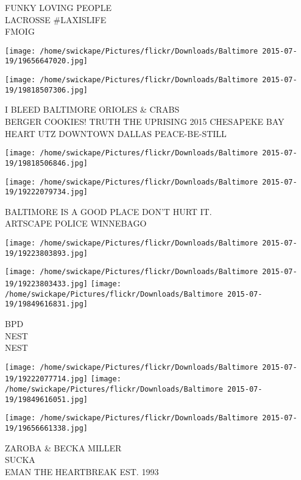 \documentclass[10pt,letterpaper]{article}
\begin{document}
FUNKY LOVING PEOPLE\\
LACROSSE \#LAXISLIFE\\
FMOIG\\
\pagebreak

\texttt{[image: /home/swickape/Pictures/flickr/Downloads/Baltimore 2015-07-19/19656647020.jpg]}

\vspace{0.25in}
\texttt{[image: /home/swickape/Pictures/flickr/Downloads/Baltimore 2015-07-19/19818507306.jpg]}

I BLEED BALTIMORE ORIOLES \& CRABS\\
BERGER COOKIES!  TRUTH THE UPRISING 2015 CHESAPEKE BAY HEART UTZ DOWNTOWN DALLAS PEACE{-}BE{-}STILL\\
\pagebreak

\texttt{[image: /home/swickape/Pictures/flickr/Downloads/Baltimore 2015-07-19/19818506846.jpg]}

\vspace{0.25in}
\texttt{[image: /home/swickape/Pictures/flickr/Downloads/Baltimore 2015-07-19/19222079734.jpg]}

BALTIMORE IS A GOOD PLACE DON'T HURT IT.\\
ARTSCAPE POLICE WINNEBAGO\\
\pagebreak

\texttt{[image: /home/swickape/Pictures/flickr/Downloads/Baltimore 2015-07-19/19223803893.jpg]}

\vspace{0.25in}
\texttt{[image: /home/swickape/Pictures/flickr/Downloads/Baltimore 2015-07-19/19223803433.jpg]}
\texttt{[image: /home/swickape/Pictures/flickr/Downloads/Baltimore 2015-07-19/19849616831.jpg]}

BPD\\
NEST\\
NEST\\
\pagebreak

\texttt{[image: /home/swickape/Pictures/flickr/Downloads/Baltimore 2015-07-19/19222077714.jpg]}
\texttt{[image: /home/swickape/Pictures/flickr/Downloads/Baltimore 2015-07-19/19849616051.jpg]}

\vspace{0.25in}
\texttt{[image: /home/swickape/Pictures/flickr/Downloads/Baltimore 2015-07-19/19656661338.jpg]}

ZAROBA \& BECKA MILLER\\
SUCKA\\
EMAN THE HEARTBREAK EST. 1993\\
\pagebreak
\end{document}

